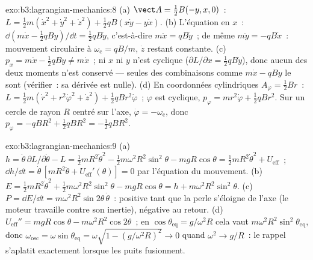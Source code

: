 \begin{solution}{exo:b3:lagrangian-mechanics:8}
(a) $\vect A = \tfrac12 B(-y, x, 0)$~:
$L = \tfrac12 m(\dot x^2 + \dot y^2 + \dot z^2) + \tfrac12 qB(x\dot y -
y\dot x)$. (b) L'équation en $x$~: $\dd(m\dot x - \tfrac12 qBy)/\dd t =
\tfrac12 qB\dot y$, c'est-à-dire $m\ddot x = qB\dot y$~; de même $m\ddot y =
-qB\dot x$~: mouvement circulaire à $\omega_{\text{c}} = qB/m$, $\dot z$
restant constante. (c) $p_x = m\dot x - \tfrac12 qBy \neq m\dot x$~; ni $x$
ni $y$ n'est cyclique ($\partial L/\partial x = \tfrac12 qB\dot y$), donc
aucun des deux moments n'est conservé --- seules des combinaisons comme $m\dot x -
qBy$ le sont (vérifier~: sa dérivée est nulle). (d) En coordonnées
cylindriques $A_\varphi = \tfrac12 Br$~:
$L = \tfrac12 m(\dot r^2 + r^2\dot\varphi^2 + \dot z^2) + \tfrac12
qBr^2\dot\varphi$~; $\varphi$ est cyclique, $p_\varphi = mr^2\dot\varphi +
\tfrac12 qBr^2$. Sur un cercle de rayon $R$ centré sur l'axe,
$\dot\varphi = -\omega_{\text{c}}$, donc $p_\varphi = -qBR^2 + \tfrac12
qBR^2 = -\tfrac12 qBR^2$.
\end{solution}

\begin{solution}{exo:b3:lagrangian-mechanics:9}
(a) $h = \dot\theta\,\partial L/\partial\dot\theta - L = \tfrac12
mR^2\dot\theta^2 - \tfrac12 m\omega^2R^2\sin^2\theta - mgR\cos\theta =
\tfrac12 mR^2\dot\theta^2 + U_{\text{eff}}$~; $\dd h/\dd t =
\dot\theta\,[mR^2\ddot\theta + U_{\text{eff}}'(\theta)] = 0$ par
l'équation du mouvement. (b) $E = \tfrac12 mR^2\dot\theta^2 + \tfrac12
m\omega^2R^2\sin^2\theta - mgR\cos\theta = h +
m\omega^2R^2\sin^2\theta$. (c) $P = \dd E/\dd t =
m\omega^2R^2\sin2\theta\,\dot\theta$~: positive tant que la perle
s'éloigne de l'axe (le moteur travaille contre son inertie),
négative au retour. (d) $U_{\text{eff}}'' = mgR\cos\theta -
m\omega^2R^2\cos2\theta$~; en $\cos\theta_{\text{eq}} = g/\omega^2R$
cela vaut $m\omega^2R^2\sin^2\theta_{\text{eq}}$, donc
$\omega_{\text{osc}} = \omega\sin\theta_{\text{eq}} = \omega\sqrt{1 -
(g/\omega^2R)^2} \to 0$ quand $\omega^2 \to g/R$~: le rappel
s'aplatit exactement lorsque les puits fusionnent.
\end{solution}

